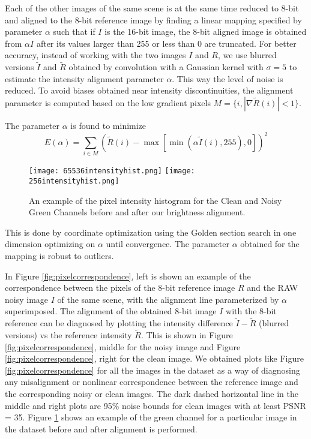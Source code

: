 \documentclass[review]{elsarticle}
\begin{document}
Each of the other images of the same scene is at the same time reduced to 8-bit and aligned to the 8-bit reference image by finding a linear mapping specified by parameter $\alpha$ such that if $I$ is the 16-bit image, the 8-bit aligned image is obtained from $\alpha I$ after its values larger than 255 or less than 0 are truncated. For better accuracy,  instead of working with the two images $I$ and $R$, we use blurred versions $\tilde I$ and $\tilde R$ obtained by convolution with a Gaussian kernel with $\sigma=5$ to estimate the intensity alignment parameter $\alpha$. This way the level of noise is reduced. To avoid biases obtained near intensity discontinuities, the alignment parameter is computed based on the low gradient pixels $M=\{i, |\nabla \tilde R(i)|<1\}$.

The parameter $\alpha$ is found to minimize
\[
E(\alpha)=\sum_{i\in M} (\tilde R(i)-\max[\min(\alpha \tilde I(i),255),0])^2
\]
\begin{figure}[t]
\centering
\texttt{[image: 65536intensityhist.png]}
\texttt{[image: 256intensityhist.png]}
\vskip -4mm
\caption{An example of the pixel intensity histogram for the Clean and Noisy Green Channels before and after our brightness alignment. }
\label {fig:alignment}
\vspace{-3mm}
\end{figure}



This is done by coordinate optimization using the Golden section search in one dimension \cite{press2007numerical} optimizing on $\alpha$ until convergence. The parameter $\alpha$ obtained for the mapping is robust to outliers. 

In Figure \ref{fig:pixelcorrespondence}, left is shown an example of the correspondence between the pixels of the 8-bit reference image $R$ and the RAW noisy image $I$ of the same scene, with the alignment line parameterized by $\alpha$ superimposed. The alignment of the obtained 8-bit image $I$ with the 8-bit reference can be diagnosed by plotting the intensity difference $\tilde I-\tilde R$ (blurred versions) vs the reference intensity $\tilde R$. This is shown in Figure \ref{fig:pixelcorrespondence}, middle for the noisy image and Figure \ref{fig:pixelcorrespondence}, right for the clean image.  We obtained plots like Figure \ref{fig:pixelcorrespondence} for all the images in the dataset as a way of diagnosing any misalignment or nonlinear correspondence between the reference image and the corresponding noisy or clean images. The dark dashed horizontal line in the middle and right plots are 95\% noise bounds for clean images with at least PSNR = 35. Figure \ref{fig:alignment} shows an example of the green channel for a particular image in the dataset before and after alignment is performed. 
\end{document}
